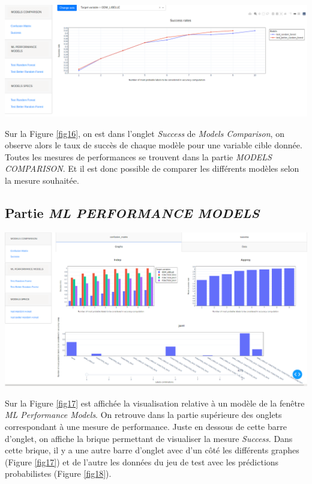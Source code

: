 \begin{center}
\includegraphics[scale=0.25]{figures/app_comparison.png}
\label{fig16}
\end{center}

Sur la Figure \ref{fig16}, on est dans l’onglet \textit{Success} de \textit{Models Comparison}, on observe alors le taux de succès de chaque modèle pour une variable cible donnée. Toutes les mesures de performances se trouvent dans la partie \textit{MODELS COMPARISON}. Et il est donc possible de comparer les différents modèles selon la mesure souhaitée.

\subsection{Partie \textit{ML PERFORMANCE MODELS}}

\begin{center}
\includegraphics[scale=0.25]{figures/app_models.png}
\label{fig17}
\end{center}

Sur la Figure \ref{fig17} est affichée la visualisation relative à un modèle de la fenêtre
\textit{ML Performance Models}. On retrouve dans la partie supérieure des onglets correspondant à
une mesure de performance.
Juste en dessous de cette barre d’onglet, on affiche la brique permettant de visualiser la mesure \textit{Success}. Dans cette brique, il y a une autre barre d’onglet avec d’un côté les différents graphes (Figure \ref{fig17}) et de l’autre les données du jeu de test avec les prédictions probabilistes (Figure \ref{fig18}).

